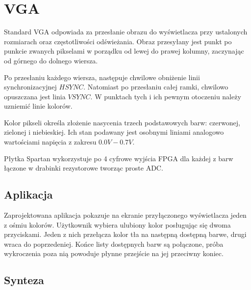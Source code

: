 \documentclass[a4paper,12pt]{article}
\begin{document}



\newpage
\section{VGA}
Standard VGA odpowiada za przesłanie obrazu do wyświetlacza przy ustalonych rozmiarach oraz częstotliwości odświeżania. Obraz przesyłany jest punkt po punkcie zwanych pikselami w porządku od lewej do prawej kolumny, zaczynając od górnego do dolnego wiersza.

Po przesłaniu każdego wiersza, następuje chwilowe obniżenie linii synchronizacyjnej $HSYNC$. Natomiast po przesłaniu całej ramki, chwilowo opuszczana jest linia $VSYNC$. W punktach tych i ich pewnym otoczeniu należy uzniemić linie kolorów.

Kolor pikseli określa złożenie nasycenia trzech podstawowych barw: czerwonej, zielonej i niebieskiej. Ich stan podawany jest osobnymi liniami analogowo wartościami napięcia z zakresu $0.0V - 0.7V$.

Płytka Spartan wykorzystuje po 4 cyfrowe wyjścia FPGA dla każdej z barw łączone w drabinki rezystorowe tworząc proste ADC.

\subsection{Aplikacja}
Zaprojektowana aplikacja pokazuje na ekranie przyłączonego wyświetlacza jeden z ośmiu kolorów. Użytkownik wybiera ulubiony kolor posługując się dwoma przyciskami. Jeden z nich przełącza kolor tła na następną dostępną barwe, drugi wraca do poprzedeniej. Końce listy dostępnych barw są połączone, próba wykroczenia poza nią powoduje płynne przejście na jej przeciwny koniec.

\subsection{Synteza}
\end{document}
